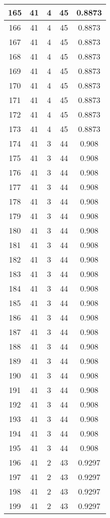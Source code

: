 \documentclass[letterpaper, 12pt]{article}
\begin{document}
\begin{longtable}{|c|c|c|c|c|}
\hline
165 & 41 & 4 & 45 & 0.8873 \\
\hline
166 & 41 & 4 & 45 & 0.8873 \\
\hline
167 & 41 & 4 & 45 & 0.8873 \\
\hline
168 & 41 & 4 & 45 & 0.8873 \\
\hline
169 & 41 & 4 & 45 & 0.8873 \\
\hline
170 & 41 & 4 & 45 & 0.8873 \\
\hline
171 & 41 & 4 & 45 & 0.8873 \\
\hline
172 & 41 & 4 & 45 & 0.8873 \\
\hline
173 & 41 & 4 & 45 & 0.8873 \\
\hline
174 & 41 & 3 & 44 & 0.908 \\
\hline
175 & 41 & 3 & 44 & 0.908 \\
\hline
176 & 41 & 3 & 44 & 0.908 \\
\hline
177 & 41 & 3 & 44 & 0.908 \\
\hline
178 & 41 & 3 & 44 & 0.908 \\
\hline
179 & 41 & 3 & 44 & 0.908 \\
\hline
180 & 41 & 3 & 44 & 0.908 \\
\hline
181 & 41 & 3 & 44 & 0.908 \\
\hline
182 & 41 & 3 & 44 & 0.908 \\
\hline
183 & 41 & 3 & 44 & 0.908 \\
\hline
184 & 41 & 3 & 44 & 0.908 \\
\hline
185 & 41 & 3 & 44 & 0.908 \\
\hline
186 & 41 & 3 & 44 & 0.908 \\
\hline
187 & 41 & 3 & 44 & 0.908 \\
\hline
188 & 41 & 3 & 44 & 0.908 \\
\hline
189 & 41 & 3 & 44 & 0.908 \\
\hline
190 & 41 & 3 & 44 & 0.908 \\
\hline
191 & 41 & 3 & 44 & 0.908 \\
\hline
192 & 41 & 3 & 44 & 0.908 \\
\hline
193 & 41 & 3 & 44 & 0.908 \\
\hline
194 & 41 & 3 & 44 & 0.908 \\
\hline
195 & 41 & 3 & 44 & 0.908 \\
\hline
196 & 41 & 2 & 43 & 0.9297 \\
\hline
197 & 41 & 2 & 43 & 0.9297 \\
\hline
198 & 41 & 2 & 43 & 0.9297 \\
\hline
199 & 41 & 2 & 43 & 0.9297 \\
\hline
\end{longtable}
\end{document}
